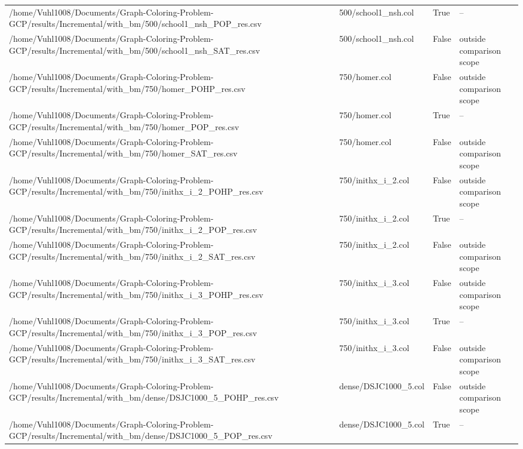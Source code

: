 \begin{table}[htbp]
\begin{tabular}{llll}
/home/Vuhl1008/Documents/Graph-Coloring-Problem-GCP/results/Incremental/with\_bm/500/school1\_nsh\_POP\_res.csv & 500/school1\_nsh.col & True & -- \\
/home/Vuhl1008/Documents/Graph-Coloring-Problem-GCP/results/Incremental/with\_bm/500/school1\_nsh\_SAT\_res.csv & 500/school1\_nsh.col & False & outside comparison scope \\
/home/Vuhl1008/Documents/Graph-Coloring-Problem-GCP/results/Incremental/with\_bm/750/homer\_POHP\_res.csv & 750/homer.col & False & outside comparison scope \\
/home/Vuhl1008/Documents/Graph-Coloring-Problem-GCP/results/Incremental/with\_bm/750/homer\_POP\_res.csv & 750/homer.col & True & -- \\
/home/Vuhl1008/Documents/Graph-Coloring-Problem-GCP/results/Incremental/with\_bm/750/homer\_SAT\_res.csv & 750/homer.col & False & outside comparison scope \\
/home/Vuhl1008/Documents/Graph-Coloring-Problem-GCP/results/Incremental/with\_bm/750/inithx\_i\_2\_POHP\_res.csv & 750/inithx\_i\_2.col & False & outside comparison scope \\
/home/Vuhl1008/Documents/Graph-Coloring-Problem-GCP/results/Incremental/with\_bm/750/inithx\_i\_2\_POP\_res.csv & 750/inithx\_i\_2.col & True & -- \\
/home/Vuhl1008/Documents/Graph-Coloring-Problem-GCP/results/Incremental/with\_bm/750/inithx\_i\_2\_SAT\_res.csv & 750/inithx\_i\_2.col & False & outside comparison scope \\
/home/Vuhl1008/Documents/Graph-Coloring-Problem-GCP/results/Incremental/with\_bm/750/inithx\_i\_3\_POHP\_res.csv & 750/inithx\_i\_3.col & False & outside comparison scope \\
/home/Vuhl1008/Documents/Graph-Coloring-Problem-GCP/results/Incremental/with\_bm/750/inithx\_i\_3\_POP\_res.csv & 750/inithx\_i\_3.col & True & -- \\
/home/Vuhl1008/Documents/Graph-Coloring-Problem-GCP/results/Incremental/with\_bm/750/inithx\_i\_3\_SAT\_res.csv & 750/inithx\_i\_3.col & False & outside comparison scope \\
/home/Vuhl1008/Documents/Graph-Coloring-Problem-GCP/results/Incremental/with\_bm/dense/DSJC1000\_5\_POHP\_res.csv & dense/DSJC1000\_5.col & False & outside comparison scope \\
/home/Vuhl1008/Documents/Graph-Coloring-Problem-GCP/results/Incremental/with\_bm/dense/DSJC1000\_5\_POP\_res.csv & dense/DSJC1000\_5.col & True & -- \\

\end{tabular}
\end{table}
